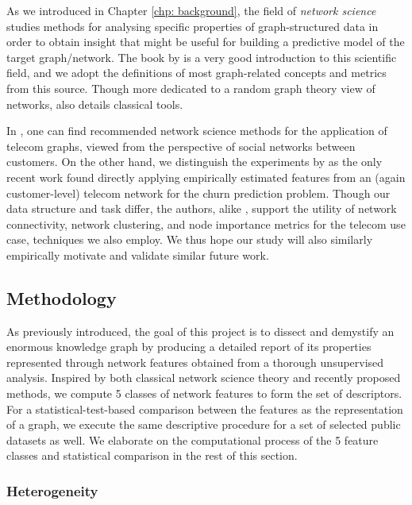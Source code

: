 As we introduced in Chapter \ref{chp: background}, the field of \emph{network science} studies methods for analysing specific properties of graph-structured data in order to obtain insight that might be useful for building a predictive model of the target graph/network. The book by \cite{barabasi_network_2016} is a very good introduction to this scientific field, and we adopt the definitions of most graph-related concepts and metrics from this source. Though more dedicated to a random graph theory view of networks, \cite{lewis_network_2011} also details classical tools.

In \cite{pinheiro_social_2011}, one can find recommended network science methods for the application of telecom graphs, viewed from the perspective of social networks between customers. On the other hand, we distinguish the experiments by \cite{kostic_social_2020} as the only recent work found directly applying empirically estimated features from an (again customer-level) telecom network for the churn prediction problem. Though our data structure and task differ, the authors, alike \cite{pinheiro_social_2011}, support the utility of network connectivity, network clustering, and node importance metrics for the telecom use case, techniques we also employ. We thus hope our study will also similarly empirically motivate and validate similar future work.

\subsection{Methodology}
\label{sec:methodology_swisscom}

As previously introduced, the goal of this project is to dissect and demystify an enormous knowledge graph by producing a detailed report of its properties represented through network features obtained from a thorough unsupervised analysis. Inspired by both classical network science theory and recently proposed methods, we compute 5 classes of network features to form the set of descriptors. For a statistical-test-based comparison between the features as the representation of a graph, we execute the same descriptive procedure for a set of selected public datasets as well. We elaborate on the computational process of the 5 feature classes and statistical comparison in the rest of this section.

\subsubsection{Heterogeneity}

